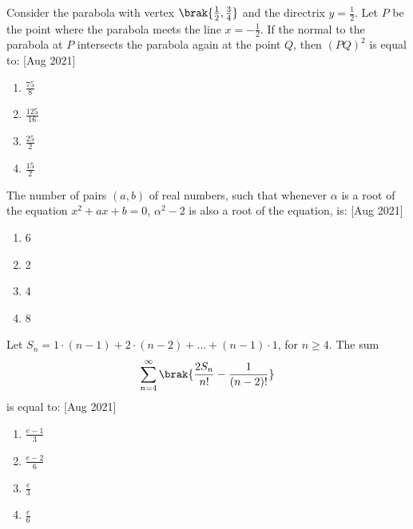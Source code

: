     \item Consider the parabola with vertex $\brak{\frac{1}{2}, \frac{3}{4}}$ and the directrix $y = \frac{1}{2}$. Let $P$ be the point where the parabola meets the line $x = -\frac{1}{2}$. If the normal to the parabola at $P$ intersects the parabola again at the point $Q$, then $(PQ)^2$ is equal to: \hfill [Aug 2021]
    \begin{multicols}{4}
        \begin{enumerate}
            \item $\frac{75}{8}$
            \item $\frac{125}{16}$
            \item $\frac{25}{2}$
            \item $\frac{15}{2}$
        \end{enumerate}
    \end{multicols}

    \item The number of pairs $(a, b)$ of real numbers, such that whenever $\alpha$ is a root of the equation $x^2 + ax + b = 0$, $\alpha^2 - 2$ is also a root of the equation, is: \hfill [Aug 2021]
    \begin{multicols}{4}
        \begin{enumerate}
            \item 6
            \item 2
            \item 4
            \item 8
        \end{enumerate}
    \end{multicols}

    \item Let $S_n = 1\cdot(n-1) + 2\cdot(n-2) + \dots + (n-1)\cdot1$, for $n \geq 4$. The sum 
    $$
    \sum_{n=4}^{\infty} \brak{\frac{2S_n}{n!} - \frac{1}{(n-2)!}}
    $$
    is equal to: \hfill [Aug 2021]
    \begin{multicols}{4}
        \begin{enumerate}
            \item $\frac{e - 1}{3}$
            \item $\frac{e - 2}{6}$
            \item $\frac{e}{3}$
            \item $\frac{e}{6}$
        \end{enumerate}
    \end{multicols}

